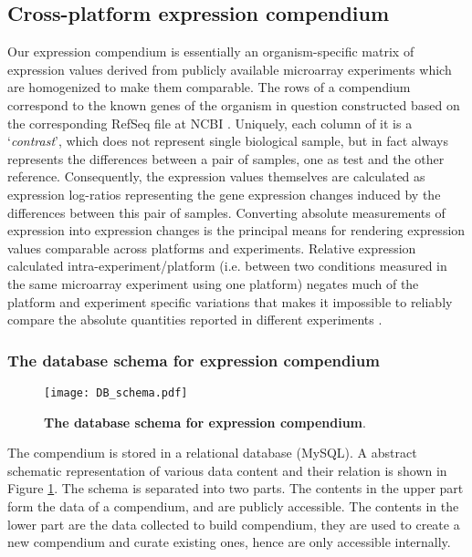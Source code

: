 \subsection{Cross-platform expression compendium}

Our expression compendium is essentially an organism-specific matrix of
expression values derived from publicly available microarray experiments which
are homogenized to make them comparable.
%
The rows of a compendium correspond to the known genes of the organism in
question constructed based on the corresponding RefSeq file at NCBI
\cite{Pruitt2007}.
%
Uniquely, each column of it is a `\textit{contrast}', which does not represent
single biological sample, but in fact always represents the differences between
a pair of samples, one as test and the other reference.
%
Consequently, the expression values themselves are calculated as expression
log-ratios representing the gene expression changes induced by the differences
between this pair of samples.
%
Converting absolute measurements of expression into expression changes is the
principal means for rendering expression values comparable across platforms and
experiments.
%
Relative expression calculated intra-experiment/platform (i.e. between two
conditions measured in the same microarray experiment using one platform)
negates much of the platform and experiment specific variations that makes it
impossible to reliably compare the absolute quantities reported in different
experiments \cite{Shi2006}.



\subsubsection{The database schema for expression compendium}\label{sec:command-db-schema}

\begin{figure}
  \centering
  \texttt{[image: DB\_schema.pdf]}
  \caption[The database schema for expression compendium]{ \textbf{The
      database schema for expression compendium}.
  }
  \label{fig:comp-db-schema}
\end{figure}

The compendium is stored in a relational database (MySQL). A abstract schematic
representation of various data content and their relation is shown in Figure
\ref{fig:comp-db-schema}.
%
The schema is separated into two parts. The contents in the upper part form the
data of a compendium, and are publicly accessible.
%
The contents in the lower part are the data collected to build compendium, they
are used to create a new compendium and curate existing ones, hence are only
accessible internally.

